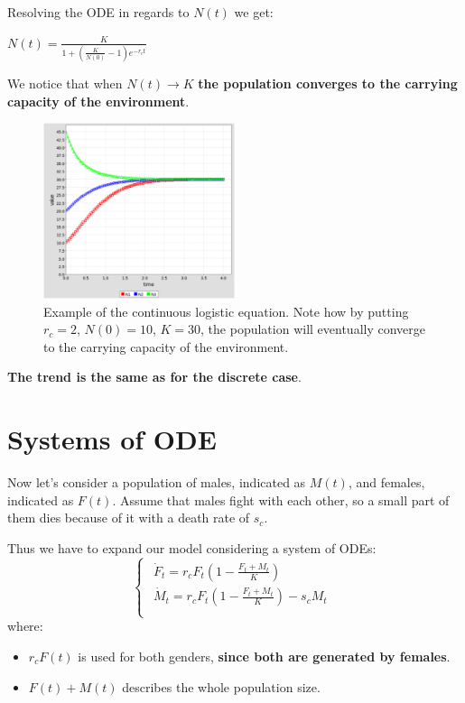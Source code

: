 Resolving the ODE in regards to $N(t)$ we get:
\begin{center}
    $N(t) = \frac{K}{1 + (\frac{K}{N(0)} - 1) e^{-r_{c}t}}$
\end{center}
We notice that when $N(t) \rightarrow K$ \textbf{the population converges to the carrying capacity of the environment}.

\begin{figure}[h]
    \centering
    \includegraphics[width=0.5\textwidth]{Images/03 - Contiguous Dynamicsl System/continuous_logistics.png}
    \caption{Example of the continuous logistic equation. Note how by putting $r_{c} = 2$, $N(0) = 10$, $K = 30$, the population will eventually converge to the carrying capacity of the environment.} 
\end{figure}

\par \textbf{The trend is the same as for the discrete case}.

\section{Systems of ODE}
Now let's consider a population of males, indicated as $M(t)$, and females, indicated as $F(t)$. Assume that males fight with each other, so a small part of them dies because of it with a death rate of $s_{c}$. 
\par Thus we have to expand our model considering a system of ODEs:
\[
\begin{cases}
    \begin{aligned}
        \dot{F}_{t} = r_{c}F_{t}(1 - \frac{F_{t} + M_{t}} {K}) \\
        \dot{M}_{t} = r_{c}F_{t}(1 - \frac{F_{t} + M_{t}}{K}) - s_{c}M_{t}\\
    \end{aligned}
\end{cases}
\]
where:
\begin{itemize}
    \item $r_{c}F(t)$ is used for both genders, \textbf{since both are generated by females}.
    \item $F(t) + M(t)$ describes the whole population size.
\end{itemize}


